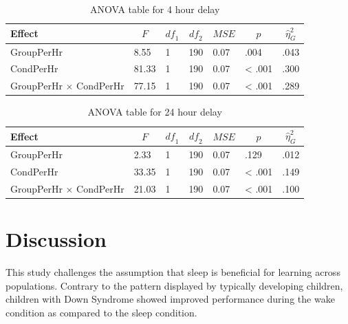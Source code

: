 \documentclass[man]{apa6}
\begin{document}
\begin{table}[tbp]
\begin{center}
\begin{threeparttable}
\caption{\label{tab:secondanova}ANOVA table for 4 hour delay}
\begin{tabular}{lllllll}
\toprule
Effect & \multicolumn{1}{c}{$F$} & \multicolumn{1}{c}{$\mathit{df}_1$} & \multicolumn{1}{c}{$\mathit{df}_2$} & \multicolumn{1}{c}{$\mathit{MSE}$} & \multicolumn{1}{c}{$p$} & \multicolumn{1}{c}{$\hat{\eta}^2_G$}\\
\midrule
GroupPerHr & 8.55 & 1 & 190 & 0.07 & .004 & .043\\
CondPerHr & 81.33 & 1 & 190 & 0.07 & < .001 & .300\\
GroupPerHr $\times$ CondPerHr & 77.15 & 1 & 190 & 0.07 & < .001 & .289\\
\bottomrule
\end{tabular}
\end{threeparttable}
\end{center}
\end{table}

\begin{table}[tbp]
\begin{center}
\begin{threeparttable}
\caption{\label{tab:secondanova}ANOVA table for 24 hour delay}
\begin{tabular}{lllllll}
\toprule
Effect & \multicolumn{1}{c}{$F$} & \multicolumn{1}{c}{$\mathit{df}_1$} & \multicolumn{1}{c}{$\mathit{df}_2$} & \multicolumn{1}{c}{$\mathit{MSE}$} & \multicolumn{1}{c}{$p$} & \multicolumn{1}{c}{$\hat{\eta}^2_G$}\\
\midrule
GroupPerHr & 2.33 & 1 & 190 & 0.07 & .129 & .012\\
CondPerHr & 33.35 & 1 & 190 & 0.07 & < .001 & .149\\
GroupPerHr $\times$ CondPerHr & 21.03 & 1 & 190 & 0.07 & < .001 & .100\\
\bottomrule
\end{tabular}
\end{threeparttable}
\end{center}
\end{table}

\section{Discussion}\label{discussion}

This study challenges the assumption that sleep is beneficial for
learning across populations. Contrary to the pattern displayed by
typically developing children, children with Down Syndrome showed
improved performance during the wake condition as compared to the sleep
condition.
\end{document}
